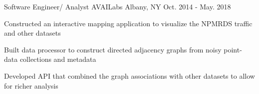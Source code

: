 \begin{cventries}
  \cventry
  {Software Engineer/ Analyst}
  {AVAILabs}
  {Albany, NY}
  {Oct. 2014 - May. 2018}
  {
    \begin{cvitems}
    \item {Constructed an interactive mapping application to visualize the NPMRDS traffic and other datasets}
    \item {Built data processor to construct directed adjacency graphs from
        noisy point-data collections and metadata  }
    \item {Developed API that combined the graph associations with other datasets to allow for richer analysis}
    \end{cvitems}
  }
  \vspace{-3.5mm}

\end{cventries}